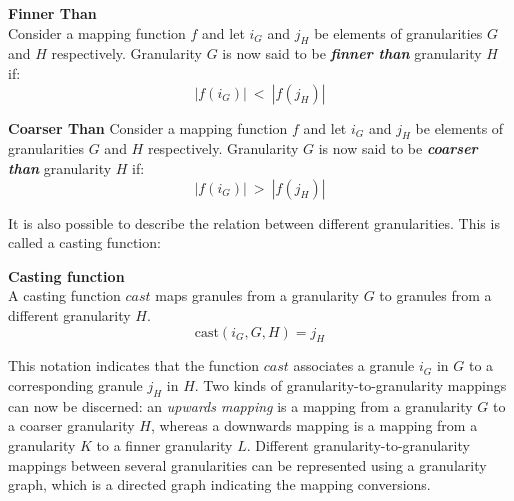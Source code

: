 \begin{svgraybox}
\vspace{-10pt}
\begin{definition}\textbf{Finner Than}\\
Consider a mapping function $f$ and let $i_G$ and $j_H$ be elements of granularities $G$ and $H$ respectively. Granularity $G$ is now said to be \emph{\textbf{finner than}} granularity $H$ if:
\begin{equation}
\label{eq:finner-than}
| f \left( i_G \right) |\ <\ |  f \left( j_H \right)| \nonumber
\end{equation} 
\end{definition}

\begin{definition}
\label{def:coarser-than}\textbf{Coarser Than}
Consider a mapping function $f$ and let $i_G$ and $j_H$ be elements of granularities $G$ and $H$ respectively. Granularity $G$ is now said to be \emph{\textbf{coarser than}} granularity $H$ if:
\begin{equation}
\label{eq:coarser-than}
| f \left( i_G \right)|\ >\ |  f \left( j_H \right)| \nonumber
\end{equation} 
\end{definition}
\vspace{-10pt}
\end{svgraybox}

It is also possible to describe the relation between different granularities. This is called a casting function:
\begin{svgraybox}
\begin{definition}
\textbf{Casting function}~\cite{Lin97}\\
\label{def:casting-fucntion}
A casting function $cast$ maps granules from a granularity $G$ to granules from a different granularity $H$.
\begin{equation}
\label{eq:cast-function}
\mbox{cast} \left( i_G,G,H \right) = j_H \nonumber
\end{equation}
\end{definition}
\end{svgraybox}

This notation indicates that the function $cast$ associates a granule $i_G$ in $G$ to a corresponding granule $j_H$ in $H$. Two kinds of granularity-to-granularity mappings can now be discerned: an \emph{upwards mapping} is a mapping from a granularity $G$ to a coarser granularity $H$, whereas a downwards mapping is a mapping from a granularity $K$ to a finner granularity $L$. Different granularity-to-granularity mappings between several granularities can be represented using a granularity graph, which is a directed graph indicating the mapping conversions.

